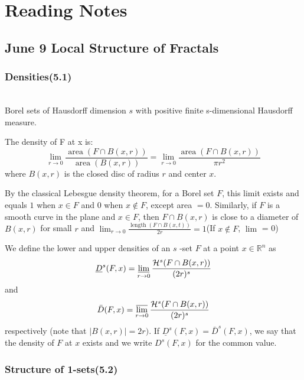 \section{Reading Notes}
\subsection{June 9 Local Structure of Fractals}
\subsubsection{Densities(5.1)}

\begin{definition}[$s$-sets] $ $\\
    Borel sets of Hausdorff dimension $s$ with positive finite s-dimensional Hausdorff measure.
\end{definition}
\begin{definition}[Density]
    The density of F at x is:
    $$
    \lim _{r \rightarrow 0} \frac{\operatorname{area}(F \cap B(x, r))}{\operatorname{area}(B(x, r))}=\lim _{r \rightarrow 0} \frac{\operatorname{area}(F \cap B(x, r))}{\pi r^{2}}
    $$
    where $B(x, r)$ is the closed disc of radius $r$ and center $x$.
\end{definition}

By the classical Lebesgue density theorem, for a Borel set $F$, this limit exists and equals $1$ when $x\in F$ and 0 when $x\notin F$, except area $=0$. Similarly, if $F$ is a smooth curve in the plane and $x\in F$, then $F\cap B(x, r)$ is close to a diameter of $B(x,r)$ for small $r$ and $\displaystyle \lim_{r\rightarrow 0}\frac{\operatorname{length}(F\cap B(x, t))}{2r} = 1$(If $x\notin F$, $\lim$ = 0)


\begin{definition}
    We define the lower and upper densities of an $s$ -set $F$ at a point $x \in \mathbb{R}^{n}$ as
$$
\underline{D}^{s}(F, x)=\varliminf_{r \rightarrow 0} \frac{\mathcal{H}^{s}(F \cap B(x, r))}{(2 r)^{s}}
$$
and
$$
\bar{D}(F, x)=\varlimsup_{r \rightarrow 0} \frac{\mathcal{H}^{s}(F \cap B(x, r))}{(2 r)^{s}}
$$
respectively (note that $|B(x, r)|=2 r)$. If $\underline{D}^{s}(F, x)=\bar{D}^{s}(F, x)$, we say that the density of $F$ at $x$ exists and we write $D^{s}(F, x)$ for the common value.
\end{definition}
\subsubsection{Structure of 1-sets(5.2)}



